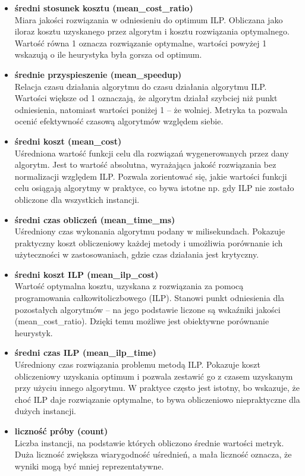 \begin{itemize}
    \item \textbf{średni stosunek kosztu (mean\_cost\_ratio)} \\
    Miara jakości rozwiązania w odniesieniu do optimum ILP. 
    Obliczana jako iloraz kosztu uzyskanego przez algorytm i kosztu rozwiązania optymalnego. 
    Wartość równa 1 oznacza rozwiązanie optymalne, wartości powyżej 1 wskazują o ile heurystyka była gorsza od optimum.

    \item \textbf{średnie przyspieszenie (mean\_speedup)} \\
    Relacja czasu działania algorytmu do czasu działania algorytmu ILP. 
    Wartości większe od 1 oznaczają, że algorytm działał szybciej niż punkt odniesienia, 
    natomiast wartości poniżej 1 – że wolniej. 
    Metryka ta pozwala ocenić efektywność czasową algorytmów względem siebie.

    \item \textbf{średni koszt (mean\_cost)} \\
    Uśredniona wartość funkcji celu dla rozwiązań wygenerowanych przez dany algorytm. 
    Jest to wartość absolutna, wyrażająca jakość rozwiązania bez normalizacji względem ILP. 
    Pozwala zorientować się, jakie wartości funkcji celu osiągają algorytmy w praktyce, 
    co bywa istotne np. gdy ILP nie zostało obliczone dla wszystkich instancji.

    \item \textbf{średni czas obliczeń (mean\_time\_ms)} \\
    Uśredniony czas wykonania algorytmu podany w milisekundach. 
    Pokazuje praktyczny koszt obliczeniowy każdej metody i umożliwia porównanie ich użyteczności 
    w zastosowaniach, gdzie czas działania jest krytyczny.

    \item \textbf{średni koszt ILP (mean\_ilp\_cost)} \\
    Wartość optymalna kosztu, uzyskana z rozwiązania za pomocą programowania całkowitoliczbowego (ILP). 
    Stanowi punkt odniesienia dla pozostałych algorytmów – na jego podstawie liczone są wskaźniki jakości (mean\_cost\_ratio). 
    Dzięki temu możliwe jest obiektywne porównanie heurystyk.

    \item \textbf{średni czas ILP (mean\_ilp\_time)} \\
    Uśredniony czas rozwiązania problemu metodą ILP. 
    Pokazuje koszt obliczeniowy uzyskania optimum i pozwala zestawić go z czasem uzyskanym przy użyciu innego algorytmu. 
    W praktyce często jest istotny, bo wskazuje, że choć ILP daje rozwiązanie optymalne, 
    to bywa obliczeniowo niepraktyczne dla dużych instancji.

    \item \textbf{liczność próby (count)} \\
    Liczba instancji, na podstawie których obliczono średnie wartości metryk. 
    Duża liczność zwiększa wiarygodność uśrednień, a mała liczność oznacza, 
    że wyniki mogą być mniej reprezentatywne. 
\end{itemize}


